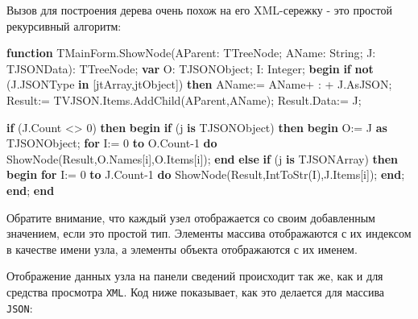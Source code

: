 \documentclass[
]{article}
\newenvironment{Shaded}{}{}
\newcommand{\DataTypeTok}[1]{\textcolor[rgb]{0.56,0.13,0.00}{#1}}
\newcommand{\DecValTok}[1]{\textcolor[rgb]{0.25,0.63,0.44}{#1}}
\newcommand{\KeywordTok}[1]{\textcolor[rgb]{0.00,0.44,0.13}{\textbf{#1}}}
\newcommand{\NormalTok}[1]{#1}
\newcommand{\StringTok}[1]{\textcolor[rgb]{0.25,0.44,0.63}{#1}}
\begin{document}
Вызов для построения дерева очень похож на его XML-сережку - это простой
рекурсивный алгоритм:

\begin{Shaded}
\begin{Highlighting}[]
\KeywordTok{function}\NormalTok{ TMainForm.ShowNode(AParent: TTreeNode; AName: }\DataTypeTok{String}\NormalTok{; J: TJSONData): TTreeNode;}
\KeywordTok{var}
\NormalTok{  O: TJSONObject;}
\NormalTok{  I: }\DataTypeTok{Integer}\NormalTok{;}
\KeywordTok{begin}
  \KeywordTok{if} \KeywordTok{not}\NormalTok{ (J.JSONType }\KeywordTok{in}\NormalTok{ [jtArray,jtObject]) }\KeywordTok{then}
\NormalTok{    AName:= AName+ }\StringTok{\textquotesingle{} : \textquotesingle{}}\NormalTok{ + J.AsJSON;}
\NormalTok{  Result:= TVJSON.Items.AddChild(AParent,AName);}
\NormalTok{  Result.Data:= J;}

  \KeywordTok{if}\NormalTok{ (J.Count \textless{}\textgreater{} }\DecValTok{0}\NormalTok{) }\KeywordTok{then}
  \KeywordTok{begin}
    \KeywordTok{if}\NormalTok{ (j }\KeywordTok{is}\NormalTok{ TJSONObject) }\KeywordTok{then}
      \KeywordTok{begin}
\NormalTok{        O:= J }\KeywordTok{as}\NormalTok{ TJSONObject;}
        \KeywordTok{for}\NormalTok{ I:= }\DecValTok{0} \KeywordTok{to}\NormalTok{ O.Count}\DecValTok{{-}1} \KeywordTok{do}
\NormalTok{        ShowNode(Result,O.Names[i],O.Items[i]);}
      \KeywordTok{end}
    \KeywordTok{else}
      \KeywordTok{if}\NormalTok{ (j }\KeywordTok{is}\NormalTok{ TJSONArray) }\KeywordTok{then}
      \KeywordTok{begin}
        \KeywordTok{for}\NormalTok{ I:= }\DecValTok{0} \KeywordTok{to}\NormalTok{ J.Count}\DecValTok{{-}1} \KeywordTok{do}
\NormalTok{        ShowNode(Result,IntToStr(I),J.Items[i]);}
      \KeywordTok{end}\NormalTok{;}
  \KeywordTok{end}\NormalTok{;}
\KeywordTok{end}
\end{Highlighting}
\end{Shaded}

Обратите внимание, что каждый узел отображается со своим добавленным
значением, если это простой тип. Элементы массива отображаются с их
индексом в качестве имени узла, а элементы объекта отображаются с их
именем.

Отображение данных узла на панели сведений происходит так же, как и для
средства просмотра \texttt{XML}. Код ниже показывает, как это делается
для массива \texttt{JSON}:
\end{document}
